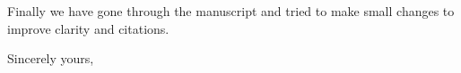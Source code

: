 \documentclass[11pt,letterpaper]{letter} %
\begin{document}
\begin{letter}
Finally we have gone through the manuscript and tried to make small changes to improve clarity and citations.

\closing{Sincerely yours,}

\end{letter}
\end{document}
